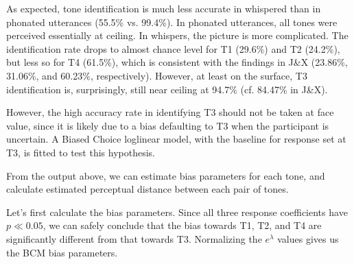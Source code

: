 \documentclass[12pt,letterpaper]{scrartcl}
\begin{document}
As expected, tone identification is much less accurate in whispered than in phonated utterances (55.5\% vs. 99.4\%). In phonated utterances, all tones were perceived essentially at ceiling. In whispers, the picture is more complicated. The identification rate drops to almost chance level for T1 (29.6\%) and T2 (24.2\%), but less so for T4 (61.5\%), which is consistent with the findings in J\&X (23.86\%, 31.06\%, and 60.23\%, respectively). However, at least on the surface, T3 identification is, surprisingly, still near ceiling at 94.7\% (cf. 84.47\% in J\&X). 


However, the high accuracy rate in identifying T3 should not be taken at face value, since it is likely due to a bias defaulting to T3 when the participant is uncertain. A Biased Choice loglinear model, with the baseline for response set at T3, is fitted to test this hypothesis. 

From the output above, we can estimate bias parameters for each tone, and calculate estimated perceptual distance between each pair of tones. 

Let's first calculate the bias parameters. Since all three response coefficients have $p \ll  0.05$, we can safely conclude that the bias towards T1, T2, and T4 are significantly different from that towards T3. Normalizing the $e^\lambda$ values gives us the BCM bias parameters.
\end{document}
